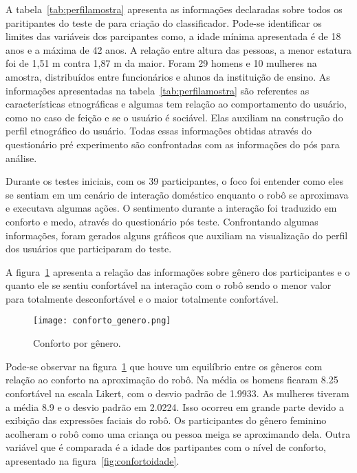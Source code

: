 A tabela~\ref{tab:perfilamostra} apresenta as informações declaradas sobre todos os paritipantes do teste de para criação do classificador. Pode-se identificar os limites das variáveis dos parcipantes como, a idade mínima apresentada é de 18 anos e a máxima de 42 anos. A relação entre altura das pessoas, a menor estatura foi de 1,51 m contra 1,87 m da maior. Foram 29 homens e 10 mulheres na amostra, distribuídos entre funcionários e alunos da instituição de ensino. As informações apresentadas na tabela~\ref{tab:perfilamostra} são referentes as características etnográficas e algumas tem relação ao comportamento do usuário, como no caso de feição e se o usuário é sociável. Elas auxiliam na construção do perfil etnográfico do usuário. Todas essas informações obtidas através do questionário pré experimento são confrontadas com as informações do pós para análise.

Durante os testes iniciais, com os 39 participantes, o foco foi entender como eles se sentiam em um cenário de interação doméstico enquanto o robô se aproximava e executava algumas ações. O sentimento durante a interação foi traduzido em conforto e medo, através do questionário pós teste. Confrontando algumas informações, foram gerados alguns gráficos que auxiliam na visualização do perfil dos usuários que participaram do teste.

A figura~\ref{fig:confortogenero} apresenta a relação das informações sobre gênero dos participantes e o quanto ele se sentiu confortável na interação com o robô sendo o menor valor para totalmente desconfortável e o maior totalmente confortável.

\begin{figure}[ht!]
	\centering
	\begin{minipage}{0.65\textwidth}
		\caption{Conforto por gênero.}
		\texttt{[image: conforto\_genero.png]}
		\label{fig:confortogenero}
	\end{minipage}
\end{figure}

Pode-se observar na figura~\ref{fig:confortogenero} que houve um equilíbrio entre os gêneros com relação ao conforto na aproximação do robô. Na média os homens ficaram 8.25 confortável na escala Likert, com o desvio padrão de 1.9933. As mulheres tiveram a média 8.9 e o desvio padrão em 2.0224. Isso ocorreu em grande parte devido a exibição das expressões faciais do robô. Os participantes do gênero feminino acolheram o robô como uma criança ou pessoa meiga se aproximando dela. Outra variável que é comparada é a idade dos partipantes com o nível de conforto, apresentado na figura~\ref{fig:confortoidade}.

